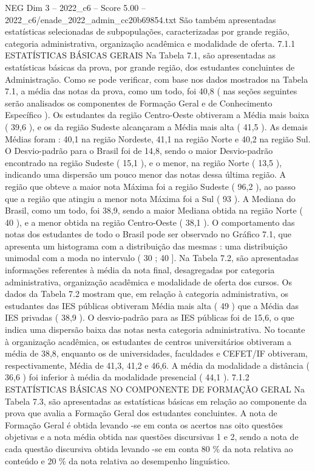 \begin{textsample}{NEG Dim 3 – 2022\_c6 – Score 5.00 – 2022\_c6/enade\_2022\_admin\_cc20b69854.txt}
São também apresentadas estatísticas selecionadas de subpopulações, caracterizadas por grande região, categoria administrativa, organização acadêmica e modalidade de oferta. 7.1.1 ESTATÍSTICAS BÁSICAS GERAIS Na Tabela 7.1, são apresentadas as estatísticas básicas da prova, por grande região, dos estudantes concluintes de Administração.
Como se pode verificar, com base nos dados mostrados na Tabela 7.1, a média das notas da prova, como um todo, foi 40,8 ( nas seções seguintes serão analisados os componentes de Formação Geral e de Conhecimento Específico ).
Os estudantes da região Centro-Oeste obtiveram a Média mais baixa ( 39,6 ), e os da região Sudeste alcançaram a Média mais alta ( 41,5 ).
As demais Médias foram : 40,1 na região Nordeste, 41,1 na região Norte e 40,2 na região Sul.
O Desvio-padrão para o Brasil foi de 14,8, sendo o maior Desvio-padrão encontrado na região Sudeste ( 15,1 ), e o menor, na região Norte ( 13,5 ), indicando uma dispersão um pouco menor das notas dessa última região.
A região que obteve a maior nota Máxima foi a região Sudeste ( 96,2 ), ao passo que a região que atingiu a menor nota Máxima foi a Sul ( 93 ).
A Mediana do Brasil, como um todo, foi 38,9, sendo a maior Mediana obtida na região Norte ( 40 ), e a menor obtida na região Centro-Oeste ( 38,1 ).
O comportamento das notas dos estudantes de todo o Brasil pode ser observado no Gráfico 7.1, que apresenta um histograma com a distribuição das mesmas : uma distribuição unimodal com a moda no intervalo ( 30 ; 40 ].
Na Tabela 7.2, são apresentadas informações referentes à média da nota final, desagregadas por categoria administrativa, organização acadêmica e modalidade de oferta dos cursos.
Os dados da Tabela 7.2 mostram que, em relação à categoria administrativa, os estudantes das IES públicas obtiveram Média mais alta ( 49 ) que a Média das IES privadas ( 38,9 ).
O desvio-padrão para as IES públicas foi de 15,6, o que indica uma dispersão baixa das notas nesta categoria administrativa.
No tocante à organização acadêmica, os estudantes de centros universitários obtiveram a média de 38,8, enquanto os de universidades, faculdades e CEFET/IF obtiveram, respectivamente, Média de 41,3, 41,2 e 46,6.
A média da modalidade a distância ( 36,6 ) foi inferior à média da modalidade presencial ( 44,1 ). 7.1.2 ESTATÍSTICAS BÁSICAS NO COMPONENTE DE FORMAÇÃO GERAL Na Tabela 7.3, são apresentadas as estatísticas básicas em relação ao componente da prova que avalia a Formação Geral dos estudantes concluintes.
A nota de Formação Geral é obtida levando -se em conta os acertos nas oito questões objetivas e a nota média obtida nas questões discursivas 1 e 2, sendo a nota de cada questão discursiva obtida levando -se em conta 80 \% da nota relativa ao conteúdo e 20 \% da nota relativa ao desempenho linguístico.

\end{textsample}
